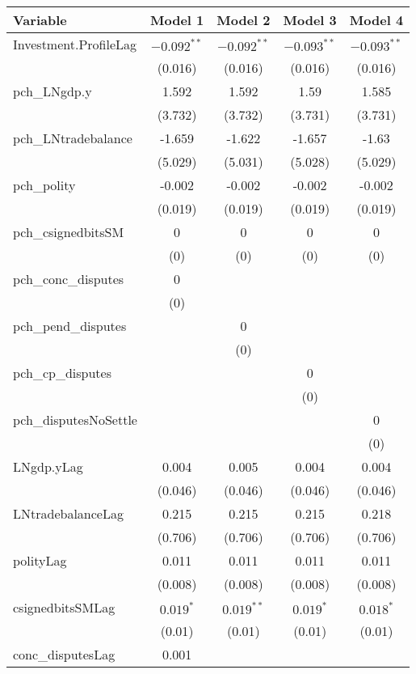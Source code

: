 \begin{table}[ht]
\centering
\begin{tabular}{lcccc}
 Variable & Model 1 & Model 2 & Model 3 & Model 4 \\ 
  \hline
\hline
Investment.ProfileLag & $-0.092^{\ast\ast}$ & $-0.092^{\ast\ast}$ & $-0.093^{\ast\ast}$ & $-0.093^{\ast\ast}$ \\ 
   & (0.016) & (0.016) & (0.016) & (0.016) \\ 
   \hline
pch\_LNgdp.y & 1.592 & 1.592 & 1.59 & 1.585 \\ 
   & (3.732) & (3.732) & (3.731) & (3.731) \\ 
  pch\_LNtradebalance & -1.659 & -1.622 & -1.657 & -1.63 \\ 
   & (5.029) & (5.031) & (5.028) & (5.029) \\ 
  pch\_polity & -0.002 & -0.002 & -0.002 & -0.002 \\ 
   & (0.019) & (0.019) & (0.019) & (0.019) \\ 
  pch\_csignedbitsSM & 0 & 0 & 0 & 0 \\ 
   & (0) & (0) & (0) & (0) \\ 
  pch\_conc\_disputes & 0 &  &  &  \\ 
   & (0) &  &  &  \\ 
  pch\_pend\_disputes &  & 0 &  &  \\ 
   &  & (0) &  &  \\ 
  pch\_cp\_disputes &  &  & 0 &  \\ 
   &  &  & (0) &  \\ 
  pch\_disputesNoSettle &  &  &  & 0 \\ 
   &  &  &  & (0) \\ 
   \hline
LNgdp.yLag & 0.004 & 0.005 & 0.004 & 0.004 \\ 
   & (0.046) & (0.046) & (0.046) & (0.046) \\ 
  LNtradebalanceLag & 0.215 & 0.215 & 0.215 & 0.218 \\ 
   & (0.706) & (0.706) & (0.706) & (0.706) \\ 
  polityLag & 0.011 & 0.011 & 0.011 & 0.011 \\ 
   & (0.008) & (0.008) & (0.008) & (0.008) \\ 
  csignedbitsSMLag & $0.019^{\ast}$ & $0.019^{\ast\ast}$ & $0.019^{\ast}$ & $0.018^{\ast}$ \\ 
   & (0.01) & (0.01) & (0.01) & (0.01) \\ 
  conc\_disputesLag & 0.001 &  &  &  \\ 

\end{tabular}
\end{table}
